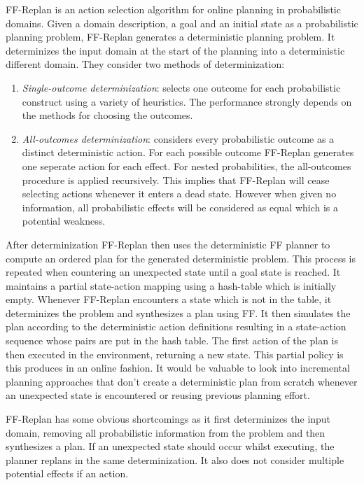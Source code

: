 \documentclass[runningheads,a4paper]{llncs}
\begin{document}
FF-Replan is an action selection algorithm for online planning in probabilistic domains. Given a domain description, a goal and an initial state as a probabilistic planning problem, FF-Replan generates a deterministic planning problem. It determinizes the input domain at the start of the planning into a deterministic different domain. They consider two methods of determinization:
\begin{enumerate}
	\item \emph{Single-outcome determinization}: selects one outcome for each probabilistic construct using a variety of heuristics. The performance strongly depends on the methods for choosing the outcomes.
	\item \emph{All-outcomes determinization}: considers every probabilistic outcome as a distinct deterministic action. For each possible outcome  FF-Replan generates one seperate action for each effect. For nested probabilities, the all-outcomes procedure is applied recursively. This implies that FF-Replan will cease selecting actions whenever it enters a dead state. However when given no information, all probabilistic effects will be considered as equal which is a potential weakness.
\end{enumerate}

After determinization FF-Replan then uses the deterministic FF planner to compute an ordered plan for the generated deterministic problem. This process is repeated when countering an unexpected state until a goal state is reached. It maintains a partial state-action mapping using a hash-table which is initially empty. Whenever FF-Replan encounters a state which is not in the table, it determinizes the problem and synthesizes a plan using FF. It then simulates the plan according to the deterministic action definitions resulting in a state-action sequence whose pairs are put in the hash table. The first action of the plan is then executed in the environment, returning a new state. This partial policy is this produces in an online fashion. It would be valuable to look into incremental planning approaches that don't create a deterministic plan from scratch whenever an unexpected state is encountered or reusing previous planning effort.

FF-Replan has some obvious shortcomings as it first determinizes the input domain, removing all probabilistic information from the problem and then synthesizes a plan. If an unexpected state should occur whilst executing, the planner replans in the same determinization. It also does not consider multiple potential effects if an action.
\end{document}
